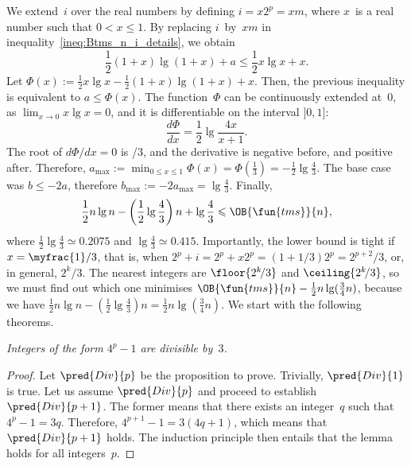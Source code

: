 We extend~\(i\) over the real numbers by defining \(i=x2^p=xm\), where
\(x\)~is a real number such that \(0 < x \leqslant 1\). By replacing
\(i\)~by~\(xm\) in inequality~\eqref{ineq:Btms_n_i_details}, we obtain
\begin{equation*}
\frac{1}{2}(1+x)\lg(1+x) + a \leqslant \frac{1}{2}x\lg x + x.
\end{equation*}
Let \(\Phi(x) := \tfrac{1}{2}x\lg x - \tfrac{1}{2}(1+x)\lg(1+x) +
x\). Then, the previous inequality is equivalent to \(a \leqslant
\Phi(x)\). The function~\(\Phi\) can be continuously extended
at~\(0\), as \(\lim_{x \to 0} x\lg x = 0\), and it is differentiable
on the interval \(]0,1]\):
\begin{equation}
\frac{d\Phi}{dx} = \frac{1}{2}\lg\frac{4x}{x+1}.
\label{eq:der_Phi}
\end{equation}
The root of \(d\Phi/dx = 0\) is /{3}, and the derivative
is negative before, and positive after. Therefore, \(a_{\max} :=
\min_{0 \leqslant x \leqslant 1}\Phi(x) = \Phi(\tfrac{1}{3}) =
-\tfrac{1}{2}\lg\tfrac{4}{3}\). The base case was \(b \leqslant -2a\),
therefore \(b_{\max} := -2a_{\max} = \lg\tfrac{4}{3}\). Finally,
\begin{equation}
  \frac{1}{2}n\lg n - \left(\frac{1}{2}\lg\frac{4}{3}\right)n + \lg\frac{4}{3}
  \leqslant \OB{\fun{tms}}{n},
\label{ineq:lower_Btms}
\end{equation}
where \(\tfrac{1}{2}\lg\tfrac{4}{3} \simeq 0.2075\) and
\(\lg\tfrac{4}{3} \simeq 0.415\). Importantly, the lower bound is
tight if \(x=\myfrac{1}/{3}\), that is, when
\(2^p+i=2^p+x2^p=(1+1/3)2^p=2^{p+2}\!/3\), or, in general,
\(2^k\!/3\). The nearest integers are \(\floor{2^k\!/3}\) and
\(\ceiling{2^k\!/3}\), so we must find out which one minimises
\(\OB{\fun{tms}}{n} - \tfrac{1}{2}n\lg(\tfrac{3}{4}n)\), because we
have \(\tfrac{1}{2}n\lg n - \left(\tfrac{1}{2}\lg\tfrac{4}{3}\right)n
= \tfrac{1}{2}n\lg(\tfrac{3}{4}n)\). We start with the following
theorems.
\begin{lemma}
\label{lem:div3}
\textsl{Integers of the form \(4^p-1\) are divisible by~\(3\).}
\end{lemma}
\begin{proof}
  Let \(\pred{Div}{p}\) be the proposition
  to prove. Trivially, \(\pred{Div}{1}\) is true. Let us assume
  \(\pred{Div}{p}\) and proceed to establish \(\pred{Div}{p+1}\). The
  former means that there exists an integer~\(q\) such that \(4^p - 1
  = 3q\). Therefore, \(4^{p+1} - 1 = 3(4q+1)\), which means that
  \(\pred{Div}{p+1}\) holds. The induction principle then entails that
  the lemma holds for all integers~\(p\).
\end{proof}
